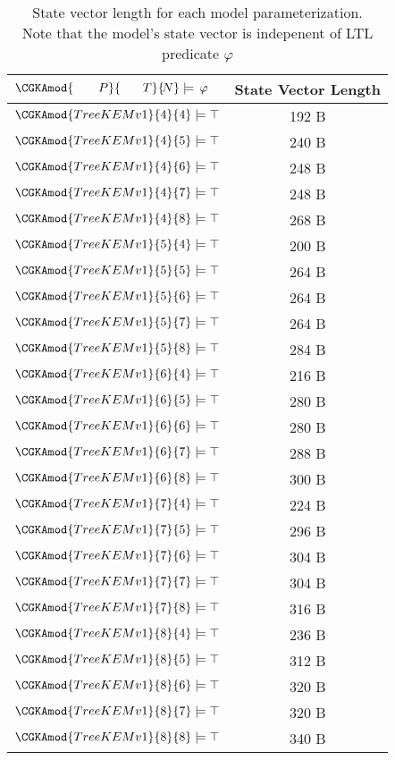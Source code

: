 \begin{table}[h!]

\centering
\label{tab:State-Vector}
\caption{State vector length for each model parameterization.\\Note that the model's state vector is indepenent of LTL predicate $\varphi$}

\begin{tabular}{ l c }

\toprule

$\CGKAmod{\quad\quad P}{\quad\;\;\: T}{\!N} \models \,\varphi$ & State Vector Length \\

\midrule

\( \CGKAmod{TreeKEMv1}{4}{4} \models \top \) & 192 B \\
\( \CGKAmod{TreeKEMv1}{4}{5} \models \top \) & 240 B \\
\( \CGKAmod{TreeKEMv1}{4}{6} \models \top \) & 248 B \\
\( \CGKAmod{TreeKEMv1}{4}{7} \models \top \) & 248 B \\
\( \CGKAmod{TreeKEMv1}{4}{8} \models \top \) & 268 B \\
\( \CGKAmod{TreeKEMv1}{5}{4} \models \top \) & 200 B \\
\( \CGKAmod{TreeKEMv1}{5}{5} \models \top \) & 264 B \\
\( \CGKAmod{TreeKEMv1}{5}{6} \models \top \) & 264 B \\
\( \CGKAmod{TreeKEMv1}{5}{7} \models \top \) & 264 B \\
\( \CGKAmod{TreeKEMv1}{5}{8} \models \top \) & 284 B \\
\( \CGKAmod{TreeKEMv1}{6}{4} \models \top \) & 216 B \\
\( \CGKAmod{TreeKEMv1}{6}{5} \models \top \) & 280 B \\
\( \CGKAmod{TreeKEMv1}{6}{6} \models \top \) & 280 B \\
\( \CGKAmod{TreeKEMv1}{6}{7} \models \top \) & 288 B \\
\( \CGKAmod{TreeKEMv1}{6}{8} \models \top \) & 300 B \\
\( \CGKAmod{TreeKEMv1}{7}{4} \models \top \) & 224 B \\
\( \CGKAmod{TreeKEMv1}{7}{5} \models \top \) & 296 B \\
\( \CGKAmod{TreeKEMv1}{7}{6} \models \top \) & 304 B \\
\( \CGKAmod{TreeKEMv1}{7}{7} \models \top \) & 304 B \\
\( \CGKAmod{TreeKEMv1}{7}{8} \models \top \) & 316 B \\
\( \CGKAmod{TreeKEMv1}{8}{4} \models \top \) & 236 B \\
\( \CGKAmod{TreeKEMv1}{8}{5} \models \top \) & 312 B \\
\( \CGKAmod{TreeKEMv1}{8}{6} \models \top \) & 320 B \\
\( \CGKAmod{TreeKEMv1}{8}{7} \models \top \) & 320 B \\
\( \CGKAmod{TreeKEMv1}{8}{8} \models \top \) & 340 B \\

\bottomrule

\end{tabular}

\end{table}
